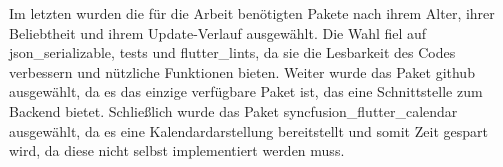 	Im letzten  wurden die für die Arbeit benötigten Pakete nach ihrem Alter, ihrer Beliebtheit und ihrem Update-Verlauf ausgewählt. Die Wahl fiel auf json\_serializable, tests und flutter\_lints, da sie die Lesbarkeit des Codes verbessern und nützliche Funktionen bieten. Weiter wurde das Paket github ausgewählt, da es das einzige verfügbare Paket ist, das eine Schnittstelle zum Backend bietet. Schließlich wurde das Paket syncfusion\_flutter\_calendar ausgewählt, da es eine Kalendardarstellung bereitstellt und somit Zeit gespart wird, da diese nicht selbst implementiert werden muss.%
%
%
%
%
%
